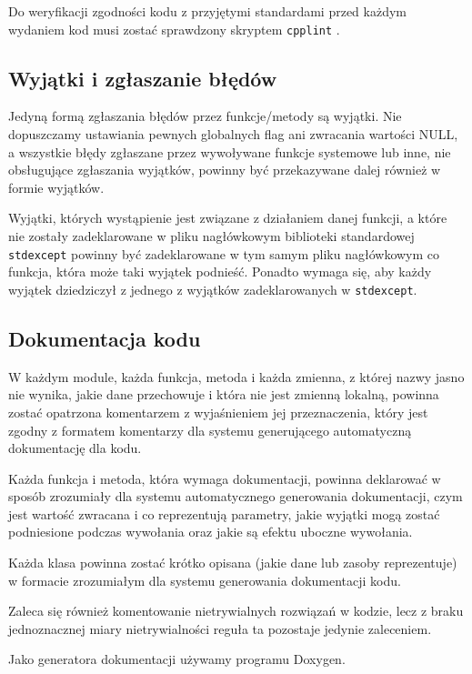 \documentclass[a4paper]{article}
\begin{document}
Do weryfikacji zgodności kodu z przyjętymi standardami przed każdym wydaniem kod musi zostać sprawdzony skryptem \verb+cpplint+ \cite{cpplint}.

\subsection{Wyjątki i zgłaszanie błędów}

Jedyną formą zgłaszania błędów przez funkcje/metody są wyjątki. Nie dopuszczamy ustawiania pewnych globalnych flag ani zwracania wartości NULL, a wszystkie błędy zgłaszane przez wywoływane funkcje systemowe lub inne, nie obsługujące zgłaszania wyjątków, powinny być przekazywane dalej również w formie wyjątków.

Wyjątki, których wystąpienie jest związane z działaniem danej funkcji, a które nie zostały zadeklarowane w pliku nagłówkowym biblioteki standardowej \verb+stdexcept+ powinny być zadeklarowane w tym samym pliku nagłówkowym co funkcja, która może taki wyjątek podnieść. Ponadto wymaga się, aby każdy wyjątek dziedziczył z jednego z wyjątków zadeklarowanych w \verb+stdexcept+.

\subsection{Dokumentacja kodu}

W każdym module, każda funkcja, metoda i każda zmienna, z której nazwy jasno nie wynika, jakie dane przechowuje i która nie jest zmienną lokalną, powinna zostać opatrzona komentarzem z wyjaśnieniem jej przeznaczenia, który jest zgodny z formatem komentarzy dla systemu generującego automatyczną dokumentację dla kodu.

Każda funkcja i metoda, która wymaga dokumentacji, powinna deklarować w sposób zrozumiały dla systemu automatycznego generowania dokumentacji, czym jest wartość zwracana i co reprezentują parametry, jakie wyjątki mogą zostać podniesione podczas wywołania oraz jakie są efektu uboczne wywołania.

Każda klasa powinna zostać krótko opisana (jakie dane lub zasoby reprezentuje) w formacie zrozumiałym dla systemu generowania dokumentacji kodu.

Zaleca się również komentowanie nietrywialnych rozwiązań w kodzie, lecz z braku jednoznacznej miary nietrywialności reguła ta pozostaje jedynie zaleceniem.

Jako generatora dokumentacji używamy programu Doxygen.
\end{document}
